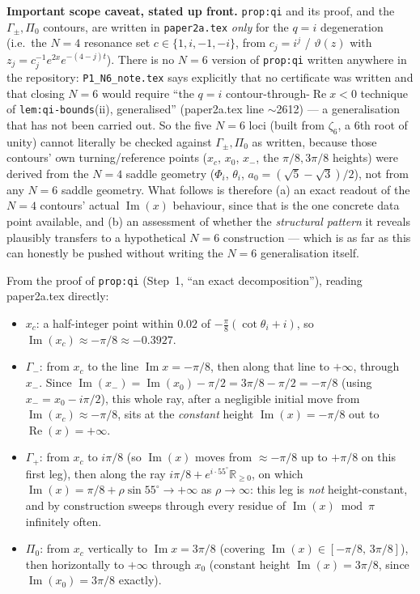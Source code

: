 \documentclass[11pt]{article}
\begin{document}
\textbf{Important scope caveat, stated up front.} \texttt{prop:qi} and its proof, and the
$\Gamma_\pm,\Pi_0$ contours, are written in \texttt{paper2a.tex} \emph{only} for the $q=i$
degeneration (i.e.\ the $N=4$ resonance set $c\in\{1,i,-1,-i\}$, from $c_j=i^j$ / $\vartheta(z)$
with $z_j=c_j^{-1}e^{2x}e^{-(4-j)t}$). There is no $N=6$ version of \texttt{prop:qi} written
anywhere in the repository: \texttt{P1\_N6\_note.tex} says explicitly that no certificate was
written and that closing $N=6$ would require ``the $q=i$ contour-through-$\operatorname{Re}x<0$
technique of \texttt{lem:qi-bounds}(ii), generalised'' (paper2a.tex line $\sim$2612) --- a
generalisation that has not been carried out. So the five $N=6$ loci (built from $\zeta_6$, a
6th root of unity) cannot literally be checked against $\Gamma_\pm,\Pi_0$ as written, because
those contours' own turning/reference points ($x_c$, $x_0$, $x_-$, the $\pi/8,3\pi/8$ heights)
were derived from the $N=4$ saddle geometry ($\Phi_i$, $\theta_i$, $a_0=(\sqrt5-\sqrt3)/2$), not
from any $N=6$ saddle geometry. What follows is therefore (a) an exact readout of the $N=4$
contours' actual $\operatorname{Im}(x)$ behaviour, since that is the one concrete data point
available, and (b) an assessment of whether the \emph{structural pattern} it reveals plausibly
transfers to a hypothetical $N=6$ construction --- which is as far as this can honestly be
pushed without writing the $N=6$ generalisation itself.

From the proof of \texttt{prop:qi} (Step~1, ``an exact decomposition''), reading paper2a.tex
directly:
\begin{itemize}
\item $x_c$: a half-integer point within $0.02$ of $-\frac\pi8(\cot\theta_i+i)$, so
$\operatorname{Im}(x_c)\approx-\pi/8\approx-0.3927$.
\item $\Gamma_-$: from $x_c$ to the line $\operatorname{Im}x=-\pi/8$, then along that line to
$+\infty$, through $x_-$. Since $\operatorname{Im}(x_-)=\operatorname{Im}(x_0)-\pi/2=3\pi/8-\pi/2
=-\pi/8$ (using $x_-=x_0-i\pi/2$), this whole ray, after a negligible initial move from
$\operatorname{Im}(x_c)\approx-\pi/8$, sits at the \emph{constant} height
$\operatorname{Im}(x)=-\pi/8$ out to $\operatorname{Re}(x)=+\infty$.
\item $\Gamma_+$: from $x_c$ to $i\pi/8$ (so $\operatorname{Im}(x)$ moves from $\approx-\pi/8$ up
to $+\pi/8$ on this first leg), then along the ray $i\pi/8+e^{i\cdot55^\circ}\mathbb R_{\ge0}$,
on which $\operatorname{Im}(x)=\pi/8+\rho\sin55^\circ\to+\infty$ as $\rho\to\infty$: this leg is
\emph{not} height-constant, and by construction sweeps through every residue of
$\operatorname{Im}(x)\bmod\pi$ infinitely often.
\item $\Pi_0$: from $x_c$ vertically to $\operatorname{Im}x=3\pi/8$ (covering
$\operatorname{Im}(x)\in[-\pi/8,\,3\pi/8]$), then horizontally to $+\infty$ through $x_0$
(constant height $\operatorname{Im}(x)=3\pi/8$, since $\operatorname{Im}(x_0)=3\pi/8$
exactly).
\end{itemize}
\end{document}

